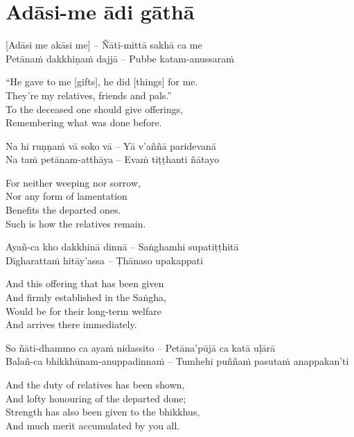 \suttaRef{[Dhs A]}

\section{Adāsi-me ādi gāthā}
\label{adasi-me-adi-gatha}

\vspace{-0.8em}

[Adāsi me akāsi me] – Ñāti-mittā sakhā ca me\\
Petānaṁ dakkhiṇaṁ dajjā – Pubbe katam-anussaraṁ

\begin{english-verses}
  ``He gave to me [gifts], he did [things] for me.\\
  They're my relatives, friends and pals.''\\
  To the deceased one should give offerings,\\
  Remembering what was done before.
\end{english-verses}

Na hi ruṇṇaṁ vā soko vā – Yā v'aññā paridevanā\\
Na taṁ petānam-atthāya – Evaṁ tiṭṭhanti ñātayo

\begin{english-verses}
  For neither weeping nor sorrow,\\
  Nor any form of lamentation\\
  Benefits the departed ones.\\
  Such is how the relatives remain.
\end{english-verses}

Ayañ-ca kho dakkhinā dinnā – Saṅghamhi supatiṭṭhitā\\
Dīgharattaṁ hitāy'assa – Ṭhānaso upakappati

\begin{english-verses}
  And this offering that has been given\\
  And firmly established in the Saṅgha,\\
  Would be for their long-term welfare\\
  And arrives there immediately.
\end{english-verses}

So ñāti-dhammo ca ayaṁ nidassito – Petāna'pūjā ca katā uḷārā\\
Balañ-ca bhikkhūnam-anuppadinnaṁ – Tumhehi puññaṁ pasutaṁ anappakan'ti

\begin{english-verses}
  And the duty of relatives has been shown,\\
  And lofty honouring of the departed done;\\
  Strength has also been given to the bhikkhus,\\
  And much merit accumulated by you all.
\end{english-verses}

